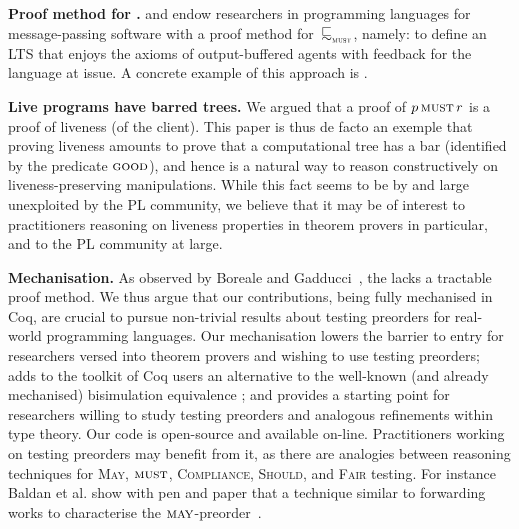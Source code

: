{\bfseries Proof method for \mustpreorder.}
 and 
endow researchers in programming languages for message-passing
software with a proof method for~$\testleqS$, namely: to define an LTS
that enjoys the axioms of output-buffered agents with feedback for the
language at issue.
%
A concrete example of this approach is .


{\bfseries Live programs have barred trees.}  We argued that a proof
of $p \operatorname{\textsc{must}} r$ is a proof of liveness (of the
client). This paper is thus de facto an exemple that proving
liveness amounts to prove that a computational tree has a bar (identified
by the predicate $\goodSym$), and hence \barinduction is a natural way
to reason constructively on liveness-preserving manipulations.
  While this fact seems to be by and large 
  unexploited by the PL community, we believe that it may %
  be of interest to practitioners reasoning on liveness
  properties %
  in theorem provers in particular, and to the PL
  community at large.

    {\bfseries Mechanisation.} %
    As observed %
    by Boreale and
    Gadducci~\cite{DBLP:journals/tcs/BorealeG06},
    the \mustpreorder lacks a tractable proof method.  We thus argue
    that our contributions, being fully mechanised in Coq, are crucial
    to pursue non-trivial results about testing preorders for
    real-world programming languages.  Our mechanisation %
    lowers the barrier to entry for researchers versed into theorem
    provers and %
    wishing to use testing preorders; %
    adds to the toolkit of Coq users an alternative to the well-known
    (and already mechanised) bisimulation equivalence
    \cite{DBLP:conf/lics/Pous16}; and provides a starting point
    for researchers willing to study testing preorders and analogous
    refinements within type theory.  Our code is open-source and
    available on-line. Practitioners working on testing preorders may
    benefit from it, as there are analogies between reasoning
    techniques for \textsc{May}, $\operatorname{\textsc{must}}$, \textsc{Compliance},
    \textsc{Should}, and \textsc{Fair} testing.
    For instance Baldan et al. show with pen and paper
    that a technique similar to forwarding works to
    characterise the $\May$-preorder~\cite{DBLP:conf/birthday/BaldanBGV15}.
%  
  
